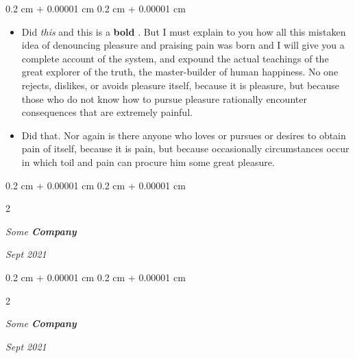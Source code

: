 \documentclass[10pt, letterpaper]{article}
\newenvironment{highlights}{
    \begin{itemize}[
        topsep=0.10 cm,
        parsep=0.10 cm,
        partopsep=0pt,
        itemsep=0pt,
        leftmargin=0.4 cm + 10pt
    ]
}{
    \end{itemize}
} %
\newenvironment{onecolentry}{
    \begin{adjustwidth}{
        0.2 cm + 0.00001 cm
    }{
        0.2 cm + 0.00001 cm
    }
}{
    \end{adjustwidth}
} %
\newenvironment{twocolentry}[2][]{
    \onecolentry
    \def\secondColumn{#2}
    \setcolumnwidth{\fill, 4.5 cm}
    \begin{paracol}{2}
}{
    \switchcolumn \raggedleft \secondColumn
    \end{paracol}
    \endonecolentry
} %
\let\hrefWithoutArrow\href
\renewcommand{\href}[2]{\hrefWithoutArrow{#1}{\ifthenelse{\equal{#2}{}}{ }{#2 }\raisebox{.15ex}{\footnotesize \faExternalLink*}}}
\begin{document}
        \vspace{0.10 cm}
        \begin{onecolentry}
            \begin{highlights}
                \item Did \textit{this} and this is a \textbf{bold} \href{https://example.com}{link}. But I must explain to you how all this mistaken idea of denouncing pleasure and praising pain was born and I will give you a complete account of the system, and expound the actual teachings of the great explorer of the truth, the master-builder of human happiness. No one rejects, dislikes, or avoids pleasure itself, because it is pleasure, but because those who do not know how to pursue pleasure rationally encounter consequences that are extremely painful.
                \item Did that. Nor again is there anyone who loves or pursues or desires to obtain pain of itself, because it is pain, but because occasionally circumstances occur in which toil and pain can procure him some great pleasure.
            \end{highlights}
        \end{onecolentry}


        \vspace{0.2 cm}

            \begin{twocolentry}{


        \textit{Sept 2021}    }
                \textbf{}

                \textit{Some \textbf{Company}}
            \end{twocolentry}



        \vspace{0.2 cm}

            \begin{twocolentry}{


        \textit{Sept 2021}    }
                \textbf{}

                \textit{Some \textbf{Company}}
            \end{twocolentry}
\end{document}
